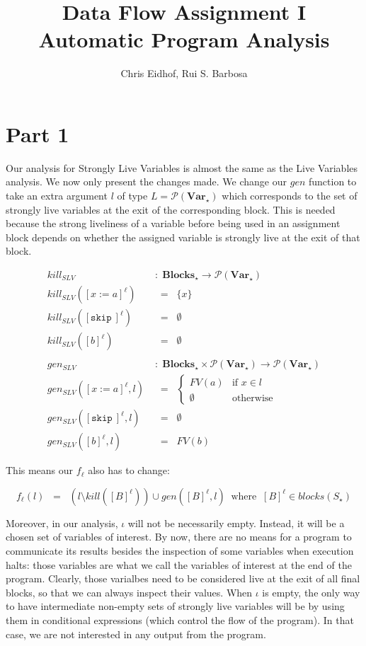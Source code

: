 \documentclass[a4wide,12pt]{article}
\def\eq{\;\; = \;\;}
\def\pset#1{\mathcal{P}(#1)}
\def\Blocks{\mathbf{Blocks}}
\def\Var {\mathbf{Var}}
\def\skip {\texttt{skip}\ }
\begin{document}
\author{Chris Eidhof, Rui S. Barbosa}
\title{Data Flow Assignment I \\ Automatic Program Analysis}
 
\maketitle
 
\section{Part 1}
 
Our analysis for Strongly Live Variables is almost the same as the Live
Variables analysis. We now only present the changes made. We
change our $gen$ function to take an extra argument $l$ of type $L = \pset{\Var_\star}$ which
corresponds to the set of strongly live variables at the exit of the corresponding block.
This is needed because the strong liveliness of a variable before
being used in an assignment block
depends on whether the assigned variable is strongly live at the exit of that block.
 
\begin{align*}
kill_{SLV} & \; : \; \Blocks_\star \to \pset{\Var_\star} \\
kill_{SLV}([x:=a]^\ell) & \eq \{x\} \\
kill_{SLV}([\skip]^\ell) & \eq \emptyset\\
kill_{SLV}([b]^\ell) & \eq \emptyset \\
\\
gen_{SLV} & \; : \; \Blocks_\star \times \pset{\Var_\star} \to \pset{\Var_\star} \\
gen_{SLV}([x:=a]^\ell,l) & \eq
         \begin{cases}
          FV(a) & \text{if $x \in l$} \\
          \emptyset & \text{otherwise}
         \end{cases} \\
gen_{SLV}([\skip]^\ell,l) & \eq \emptyset\\
gen_{SLV}([b]^\ell,l) & \eq FV(b)
\end{align*}
 
This means our $f_\ell$ also has to change:
 
\[ f_\ell(l) \eq (l \setminus kill([B]^\ell)) \cup gen([B]^\ell, l) \;\; \text{where} \;\; [B]^\ell
\in blocks(S_\star)
\]
 
Moreover, in our analysis, $\iota$ will not be necessarily empty. Instead, it will be a chosen set of
variables of interest.
By now, there are no means for a program
to communicate its results besides the inspection of some variables when execution halts: those variables
are what we call the variables of interest at the end of the program. Clearly,
those varialbes need to be considered live at the exit of all final blocks, so that we can always inspect their values.
When $\iota$ is empty, the only way to have intermediate
non-empty sets of strongly live variables will be by using them in conditional expressions (which control the
flow of the program). In that case, we are not interested in any output from the program.
 
\end{document}
